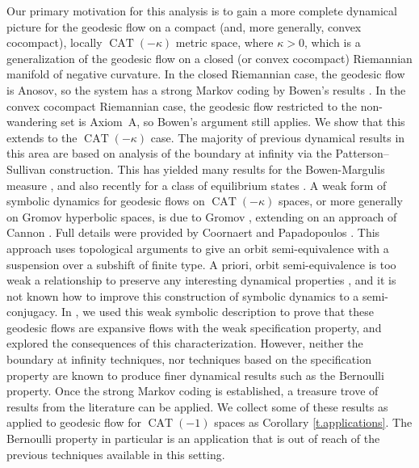 \documentclass[JEP,XML,SOM,Unicode,NoFloatCountersInSection]{cedram}
\theoremstyle{definition}
\numberwithin{equation}{section}
\DeclareMathOperator{\CAT}{CAT}
\begin{document}
Our primary motivation for this analysis is to gain a more complete dynamical picture for the geodesic flow on a compact (and, more generally, convex cocompact), locally $\CAT(-\kappa)$ metric space, where $\kappa>0$, which is a generalization of the geodesic flow on a closed (or convex cocompact) Riemannian manifold of negative curvature. In the closed Riemannian case, the geodesic flow is Anosov, so the system has a strong Markov coding by Bowen's results \cite{bowen-symbolic}. In the convex cocompact Riemannian case, the geodesic flow restricted to the non-wandering set is Axiom~A, so Bowen's argument still applies. We show that this extends to the $\CAT(-\kappa)$ case. The majority of previous dynamical results in this area are based on analysis of the boundary at infinity via the Patterson--Sullivan construction. This has yielded many results for the Bowen-Margulis measure \cite{Roblin}, and also recently for a class of equilibrium states \cite{BPP16}. A weak form of symbolic dynamics for geodesic flows on $\CAT(-\kappa)$ spaces, or more generally on Gromov hyperbolic spaces, is due to Gromov \cite{gromov}, extending on an approach of Cannon \cite{Cannon}. Full details were provided by Coornaert and Papadopoulos \cite{cp}. This approach uses topological arguments to give an orbit semi-equivalence with a suspension over a subshift of finite type. A priori, orbit semi-equivalence is too weak a relationship to preserve any interesting dynamical properties \cite{GM, KT17}, and it is not known how to improve this construction of symbolic dynamics to a semi-conjugacy. In \cite{CLT}, we used this weak symbolic description to prove that these geodesic flows are expansive flows with the weak specification property, and explored the consequences of this characterization. However, neither the boundary at infinity techniques, nor techniques based on the specification property are known to produce finer dynamical results such as the Bernoulli property. Once the strong Markov coding is established, a treasure trove of results from the literature can be applied. We collect some of these results as applied to geodesic flow for $\CAT(-1)$ spaces as Corollary \ref{t.applications}. The Bernoulli property in particular is an application that is out of reach of the previous techniques available in this setting.
\end{document}
